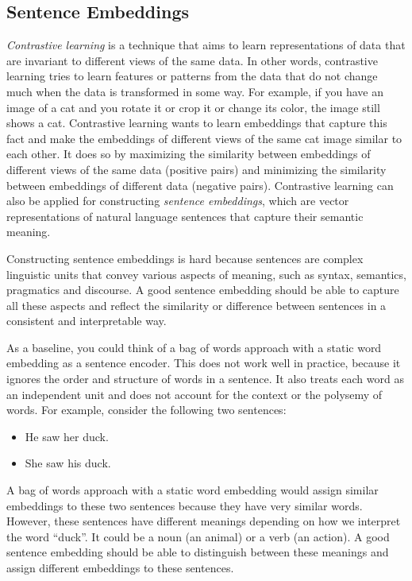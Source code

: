 \documentclass[11pt, a4paper]{amsart}
\begin{document}
\subsection{Sentence Embeddings}

\emph{Contrastive learning} is a technique that aims to learn representations of data that are invariant to different views of the same data.
In other words, contrastive learning tries to learn features or patterns from the data that do not change much when the data is transformed in some way.
For example, if you have an image of a cat and you rotate it or crop it or change its color, the image still shows a cat. 
Contrastive learning wants to learn embeddings that capture this fact and make the embeddings of different views of the same cat image similar to each other.
It does so by maximizing the similarity between embeddings of different views of the same data (positive pairs) and minimizing the similarity between embeddings of different data (negative pairs).
Contrastive learning can also be applied for constructing \emph{sentence embeddings}, which are vector representations of natural language sentences that capture their semantic meaning.

Constructing sentence embeddings is hard because sentences are complex linguistic units that convey various aspects of meaning, such as syntax, semantics, pragmatics and discourse.
A good sentence embedding should be able to capture all these aspects and reflect the similarity or difference between sentences in a consistent and interpretable way.

As a baseline, you could think of a bag of words approach with a static word embedding as a sentence encoder.
This does not work well in practice, because it ignores the order and structure of words in a sentence.
It also treats each word as an independent unit and does not account for the context or the polysemy of words.
For example, consider the following two sentences:
\begin{itemize}
	\item He saw her duck.
	\item She saw his duck.
\end{itemize}

A bag of words approach with a static word embedding would assign similar embeddings to these two sentences because they have very similar words.
However, these sentences have different meanings depending on how we interpret the word ``duck''.
It could be a noun (an animal) or a verb (an action).
A good sentence embedding should be able to distinguish between these meanings and assign different embeddings to these sentences.
\end{document}

